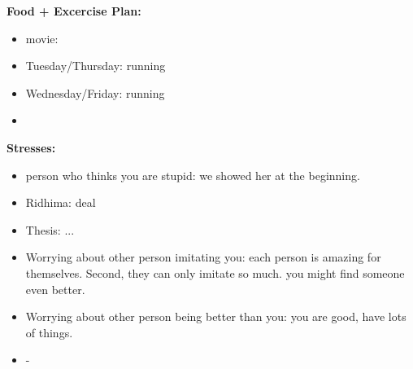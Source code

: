 \documentclass[11pt]{article}
\begin{document}
{            \textbf{Food + Excercise Plan:}\\
            \begin{itemize}

              \item \tiny movie: 
              \tiny \item \tiny Tuesday/Thursday: running 
            \item \tiny Wednesday/Friday: running 
            \item \tiny 
            \end{itemize}
            \textbf{Stresses:}\\
            \begin{itemize} 
            \item \tiny person who thinks you are stupid:  we
              showed her at the beginning. 

            \item \tiny Ridhima: deal 
            \item \tiny Thesis:  ... 

            \item \tiny Worrying about other person imitating you: each person is amazing for themselves. Second, they can only imitate so much. you might find someone even better. 
            \item \tiny Worrying about other person being better than you: you are good, have lots of things.  
            \item \tiny -
            \end{itemize}
            
}
\end{document}
